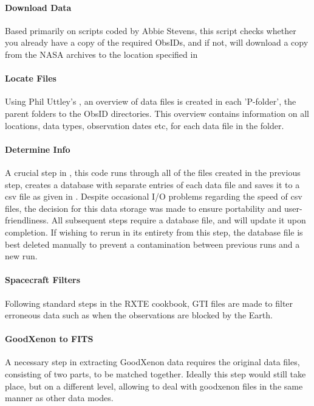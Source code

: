 \paragraph{Download Data} Based primarily on scripts coded by Abbie Stevens, this script checks whether you already have a copy of the required ObsIDs, and if not, will download a copy from the NASA archives to the location specified in 

\paragraph{Locate Files} Using Phil Uttley's , an overview of data files is created in each 'P-folder', the parent folders to the ObsID directories. This overview contains information on all locations, data types, observation dates etc, for each data file in the folder.

\paragraph{Determine Info} A crucial step in \chromos, this code runs through all of the files created in the previous step, creates a database with separate entries of each data file and saves it to a csv file as given in . Despite occasional I/O problems regarding the speed of csv files, the decision for this data storage was made to ensure portability and user-friendliness. All subsequent steps require a database file, and will update it upon completion. If wishing to rerun \chromos in its entirety from this step, the database file is best deleted manually to prevent a contamination between previous runs and a new run.

\paragraph{Spacecraft Filters} Following standard steps in the \ac{RXTE} cookbook, \acf{GTI} files are made to filter erroneous data such as when the observations are blocked by the Earth. 

\paragraph{GoodXenon to FITS} A necessary step in extracting GoodXenon data requires the original data files, consisting of two parts, to be matched together. Ideally this step would still take place, but on a different level, allowing \chromos to deal with goodxenon files in the same manner as other data modes.

